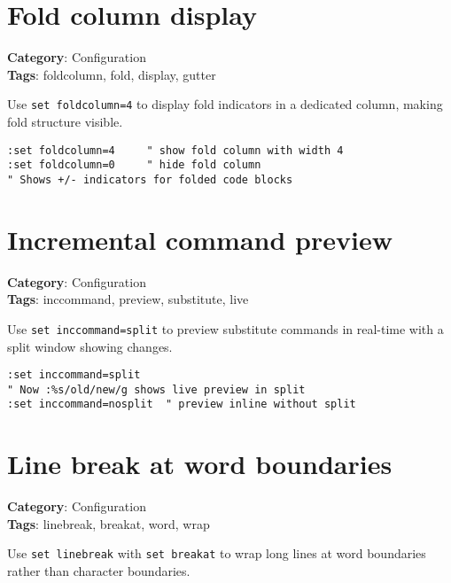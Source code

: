 \section{Fold column display}

\textbf{Category}: Configuration\\ \textbf{Tags}: foldcolumn, fold, display, gutter
\vspace{0.5cm}

Use {\footnotesize \Verb§set foldcolumn=4§} to display fold indicators in a dedicated column, making fold structure visible.

\begin{Exa*}{}
\begin{Verbatim}[fontsize=\footnotesize, breaklines, breakanywhere]
:set foldcolumn=4     " show fold column with width 4
:set foldcolumn=0     " hide fold column
" Shows +/- indicators for folded code blocks
\end{Verbatim}
\end{Exa*}

\section{Incremental command preview}

\textbf{Category}: Configuration\\ \textbf{Tags}: inccommand, preview, substitute, live
\vspace{0.5cm}

Use {\footnotesize \Verb§set inccommand=split§} to preview substitute commands in real-time with a split window showing changes.

\begin{Exa*}{}
\begin{Verbatim}[fontsize=\footnotesize, breaklines, breakanywhere]
:set inccommand=split
" Now :%s/old/new/g shows live preview in split
:set inccommand=nosplit  " preview inline without split
\end{Verbatim}
\end{Exa*}

\section{Line break at word boundaries}

\textbf{Category}: Configuration\\ \textbf{Tags}: linebreak, breakat, word, wrap
\vspace{0.5cm}

Use {\footnotesize \Verb§set linebreak§} with {\footnotesize \Verb§set breakat§} to wrap long lines at word boundaries rather than character boundaries.


